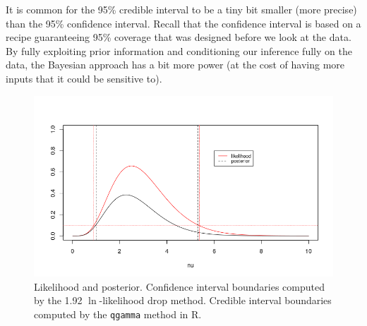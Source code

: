 \documentclass[11pt]{article}
\begin{document}
It is common for the 95\% credible interval to be a tiny bit smaller (more
precise) than the 95\% confidence interval.
Recall that the confidence interval is based on a recipe guaranteeing
    95\% coverage that was designed before we look at the data.
By fully exploiting prior information and conditioning our inference fully
on the data, the Bayesian approach has a bit more power (at the cost of 
having more inputs that it could be sensitive to).

\begin{figure}[h]
\hskip-1cm \includegraphics[scale=1]{images/dueling-cis.png}
\caption{Likelihood and posterior. Confidence interval boundaries computed
by the 1.92 $\ln$-likelihood drop method. Credible interval boundaries
computed by the {\tt qgamma} method in R. }\label{cis}
\end{figure}
\end{document}
